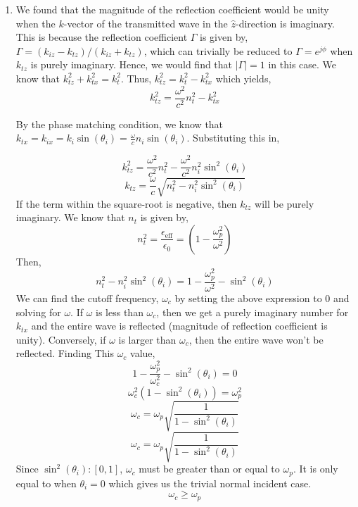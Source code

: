 \documentclass[12pt]{article}
\begin{document}
\begin{enumerate}
\begin{enumerate}
		\item [(b)]
		We found that the magnitude of the reflection coefficient would be unity when the $k$-vector of the transmitted wave in the $\hat z$-direction is imaginary. 
		This is because the reflection coefficient $\Gamma$ is given by, $\Gamma = (k_{iz}-k_{tz})/(k_{iz}+k_{tz})$, which can trivially be reduced to $\Gamma = e^{j\phi}$ when $k_{tz}$ is purely imaginary.
		Hence, we would find that $|\Gamma|=1$ in this case.
		We know that $k_{tz}^2+k_{tx}^2=k_t^2$.
		Thus, $k_{tz}^2=k_t^2-k_{tx}^2$ which yields,
		\[k_{tz}^2=\frac{\omega^2}{c^2}n_t^2-k_{tx}^2\]

		By the phase matching condition, we know that $k_{tx}=k_{ix}=k_i\sin(\theta_i)=\frac{\omega}{c}n_i\sin(\theta_i)$.
		Substituting this in,

		\[k_{tz}^2 = \frac{\omega^2}{c^2}n_t^2-\frac{\omega^2}{c^2}n_i^2\sin^2(\theta_i)\]
		\[k_{tz}=\frac{\omega}{c}\sqrt{n_t^2-n_i^2\sin^2(\theta_i)}\]
		If the term within the square-root is negative, then $k_{tz}$ will be purely imaginary.
		We know that $n_t$ is given by,
		\[n_t^2=\frac{\epsilon_{\mathrm{eff}}}{\epsilon_0}=\left(1-\frac{\omega_p^2}{\omega^2}\right)\]
		Then,
		\[n_t^2-n_i^2\sin^2(\theta_i)=1-\frac{\omega_p^2}{\omega^2}-\sin^2(\theta_i)\]
		We can find the cutoff frequency, $\omega_c$ by setting the above expression to $0$ and solving for $\omega$.
		If $\omega$ is less than $\omega_c$, then we get a purely imaginary number for $k_{tx}$ and the entire wave is reflected (magnitude of reflection coefficient is unity).
		Conversely, if $\omega$ is larger than $\omega_c$, then the entire wave won't be reflected.
		Finding This $\omega_c$ value,
		\[1-\frac{\omega_p^2}{\omega_c^2}-\sin^2(\theta_i)=0\]
		\[\omega_c^2(1-\sin^2(\theta_i))=\omega_p^2\]
		\[\omega_c=\omega_p\sqrt{\frac{1}{1-\sin^2(\theta_i)}}\]
		\[\boxed{\omega_c=\omega_p\sqrt{\frac{1}{1-\sin^2(\theta_i)}}}\]
		Since $\sin^2(\theta_i):[0,1]$, $\omega_c$ must be greater than or equal to $\omega_p$. 
		It is only equal to when $\theta_i=0$ which gives us the trivial normal incident case.
		\[\boxed{\omega_c\geq \omega_p}\]


\end{enumerate}
\end{enumerate}
\end{document}
